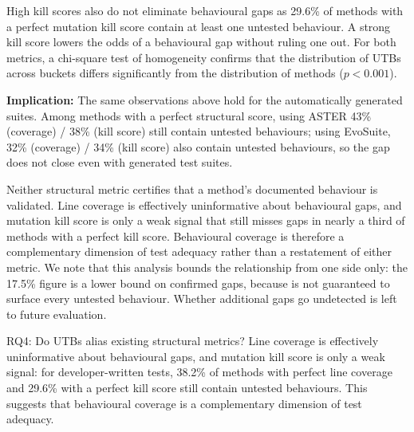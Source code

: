 High kill scores also do not eliminate behavioural gaps as 29.6\% of methods with a perfect mutation kill score contain at least one untested behaviour. 
A strong kill score lowers the odds of a behavioural gap without ruling one out. 
For both metrics, a chi-square test of homogeneity confirms that the distribution of UTBs across buckets differs significantly from the distribution of methods ($p<0.001$).

\smallskip
\noindent\textbf{Implication:} 
The same observations above hold for the automatically generated suites. 
Among methods with a perfect structural score, using ASTER 43\% (coverage) / 38\% (kill score) still contain untested behaviours; using EvoSuite, 32\% (coverage) / 34\% (kill score) also contain untested behaviours, so the gap does not close even with generated test suites.

Neither structural metric certifies that a method's documented behaviour is validated. Line coverage is effectively uninformative about behavioural gaps, and mutation kill score is only a weak signal that still misses gaps in nearly a third of methods with a perfect kill score.
Behavioural coverage is therefore a complementary dimension of test adequacy rather than a restatement of either metric. We note that this analysis bounds the relationship from one side only: the 17.5\% figure is a lower bound on confirmed gaps, because \toolname{} is not guaranteed to surface every untested behaviour. 
Whether additional gaps go undetected is left to future evaluation.


\begin{rqbox}{RQ4: Do UTBs alias existing structural metrics?}
Line coverage is effectively uninformative about behavioural gaps, and mutation kill score is only a weak signal: for developer-written tests, 38.2\% of methods with perfect line coverage and 29.6\% with a perfect kill score still contain untested behaviours. This suggests that behavioural coverage is a complementary dimension of test adequacy. %
\end{rqbox}


\endinput


\textbf{V2:}

